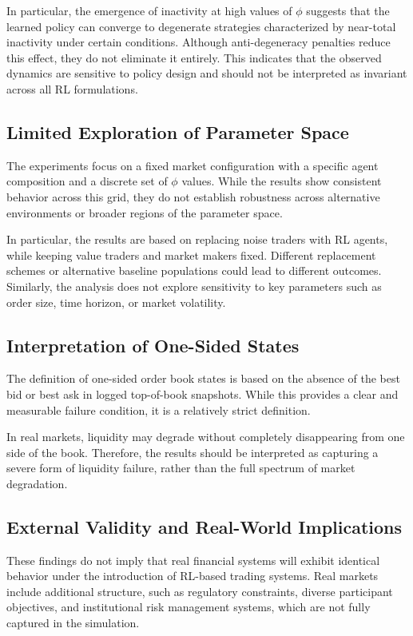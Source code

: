 \documentclass[sigconf]{acmart}
\begin{document}
In particular, the emergence of inactivity at high values of $\phi$ suggests that the learned policy can converge to degenerate strategies characterized by near-total inactivity under certain conditions. Although anti-degeneracy penalties reduce this effect, they do not eliminate it entirely. This indicates that the observed dynamics are sensitive to policy design and should not be interpreted as invariant across all RL formulations.

\subsection{Limited Exploration of Parameter Space}

The experiments focus on a fixed market configuration with a specific agent composition and a discrete set of $\phi$ values. While the results show consistent behavior across this grid, they do not establish robustness across alternative environments or broader regions of the parameter space.

In particular, the results are based on replacing noise traders with RL agents, while keeping value traders and market makers fixed. Different replacement schemes or alternative baseline populations could lead to different outcomes. Similarly, the analysis does not explore sensitivity to key parameters such as order size, time horizon, or market volatility.

\subsection{Interpretation of One-Sided States}

The definition of one-sided order book states is based on the absence of the best bid or best ask in logged top-of-book snapshots. While this provides a clear and measurable failure condition, it is a relatively strict definition.

In real markets, liquidity may degrade without completely disappearing from one side of the book. Therefore, the results should be interpreted as capturing a severe form of liquidity failure, rather than the full spectrum of market degradation.

\subsection{External Validity and Real-World Implications}

These findings do not imply that real financial systems will exhibit identical behavior under the introduction of RL-based trading systems. Real markets include additional structure, such as regulatory constraints, diverse participant objectives, and institutional risk management systems, which are not fully captured in the simulation.
\end{document}
